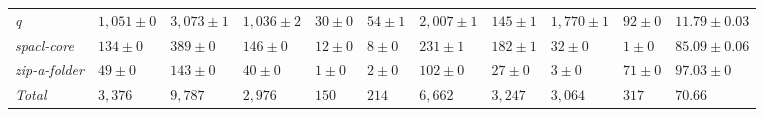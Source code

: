 \begin{table}
{\begin{tabular}[t]{lllllllllll}
\textit{q} & $1,051 \pm 0$ & $3,073 \pm 1$ & $1,036 \pm 2$ & $30 \pm 0$ & $54 \pm 1$ & $2,007 \pm 1$ & $145 \pm 1$ & $1,770 \pm 1$ & $92 \pm 0$ & $11.79 \pm 0.03$\\
\textit{spacl-core} & $134 \pm 0$ & $389 \pm 0$ & $146 \pm 0$ & $12 \pm 0$ & $8 \pm 0$ & $231 \pm 1$ & $182 \pm 1$ & $32 \pm 0$ & $1 \pm 0$ & $85.09 \pm 0.06$\\
\textit{zip-a-folder} & $49 \pm 0$ & $143 \pm 0$ & $40 \pm 0$ & $1 \pm 0$ & $2 \pm 0$ & $102 \pm 0$ & $27 \pm 0$ & $3 \pm 0$ & $71 \pm 0$ & $97.03 \pm 0$\\
\hline\textit{Total} & $3,376$ & $9,787$ & $2,976$ & $150$ & $214$ & $6,662$ & $3,247$ & $3,064$ & $317$ & $70.66$\\
\bottomrule
\end{tabular}}
\end{table}
